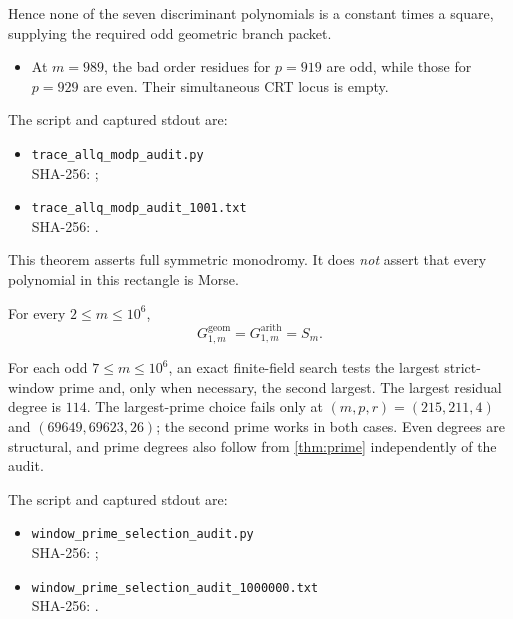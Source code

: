 Hence none of the seven discriminant polynomials is a constant times a
square, supplying the required odd geometric branch packet.

\begin{itemize}
\item At $m=989$, the bad order residues for $p=919$ are odd, while those
for $p=929$ are even. Their simultaneous CRT locus is empty.
\end{itemize}

The script and captured stdout are:
\begin{itemize}
\item \nolinkurl{trace_allq_modp_audit.py}\\[-.15em]
\textcolor{bluegray}{\small SHA-256: }
\texttt{\small{}};
\item \nolinkurl{trace_allq_modp_audit_1001.txt}\\[-.15em]
\textcolor{bluegray}{\small SHA-256: }
\texttt{\small{}}.
\end{itemize}

\begin{notebox}
This theorem asserts full symmetric monodromy. It does \emph{not} assert
that every polynomial in this rectangle is Morse.
\end{notebox}

\begin{theorem}\label{thm:million}
For every $2\le m\le10^6$,
\begin{equation}
\boxed{G^{\mathrm{geom}}_{1,m}=G^{\mathrm{arith}}_{1,m}=S_m.}
\label{eq:million}
\end{equation}
\end{theorem}

For each odd $7\le m\le10^6$, an exact finite-field search tests the largest
strict-window prime and, only when necessary, the second largest. The largest
residual degree is $114$. The largest-prime choice fails only at
$(m,p,r)=(215,211,4)$ and $(69649,69623,26)$; the second prime works in both
cases. Even degrees are structural, and prime degrees also follow from
\cref{thm:prime} independently of the audit.

The script and captured stdout are:
\begin{itemize}
\item \nolinkurl{window_prime_selection_audit.py}\\[-.15em]
\textcolor{bluegray}{\small SHA-256: }
\texttt{\small{}};
\item \nolinkurl{window_prime_selection_audit_1000000.txt}\\[-.15em]
\textcolor{bluegray}{\small SHA-256: }
\texttt{\small{}}.
\end{itemize}

